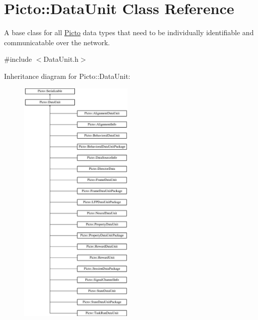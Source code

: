 \hypertarget{class_picto_1_1_data_unit}{\section{Picto\-:\-:Data\-Unit Class Reference}
\label{class_picto_1_1_data_unit}
}


A base class for all \hyperlink{namespace_picto}{Picto} data types that need to be individually identifiable and communicatable over the network.  




{\ttfamily \#include $<$Data\-Unit.\-h$>$}

Inheritance diagram for Picto\-:\-:Data\-Unit\-:\begin{figure}[H]
\begin{center}
\leavevmode
\includegraphics[height=12.000000cm]{class_picto_1_1_data_unit}
\end{center}
\end{figure}
